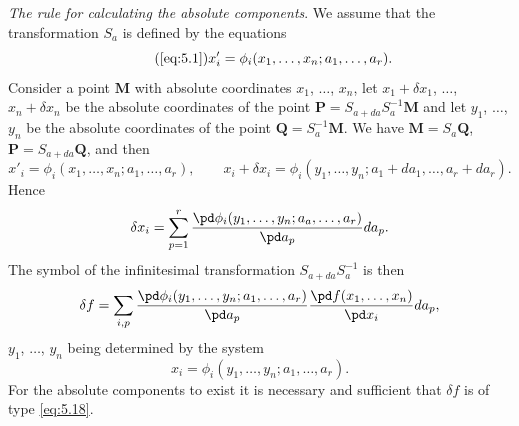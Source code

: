 \somespace

\emph{The rule for calculating the absolute components}. We assume that the transformation $S_{a}$ is defined by the equations
\begin{equation}
  \label{eq:5.1''}\tag{\ref{eq:5.1}}
  x'_{i}=\phi_{i}(x_{1},\dots,x_{n};a_{1},\dots,a_{r}).
\end{equation}
Consider a point $\mathbf{M}$ with absolute coordinates $x_{1}$, $\dots$, $x_{n}$, let $x_{1}+\delta x_{1}$, $\dots$, $x_{n}+\delta x_{n}$ be the absolute coordinates of the point $\mathbf{P}=S_{a+da}S_{a}^{-1}\mathbf{M}$ and let $y_{1}$, $\dots$, $y_{n}$ be the absolute coordinates of the point $\mathbf{Q}=S_{a}^{-1}\mathbf{M}$. We have $\mathbf{M}=S_{a}\mathbf{Q}$, $\mathbf{P}=S_{a+da}\mathbf{Q}$, and then
\[
x'_{i}=\phi_{i}(x_{1},\dots,x_{n};a_{1},\dots,a_{r}),\qquad
x_{i}+\delta x_{i}=\phi_{i}(y_{1},\dots,y_{n};a_{1}+da_{1},\dots,a_{r}+da_{r}).
\]
Hence
\[
\delta x_{i}=\sum_{p=1}^{r}\frac{\pd \phi_{i}(y_{1},\dots,y_{n};a_{a},\dots,a_{r})}{\pd a_{p}}da_{p}.
\]
The symbol of the infinitesimal transformation $S_{a+da}S_{a}^{-1}$ is then
\begin{equation}
  \label{eq:5.19}
  \delta f=\sum_{i,p}\frac{\pd\phi_{i}(y_{1},\dots,y_{n};a_{1},\dots,a_{r})}{\pd a_{p}}\frac{\pd f(x_{1},\dots,x_{n})}{\pd x_{i}}da_{p},
\end{equation}
$y_{1}$, $\dots$, $y_{n}$ being determined by the system
\begin{equation}
  \label{eq:5.20}
  x_{i}=\phi_{i}(y_{1},\dots,y_{n};a_{1},\dots,a_{r}).
\end{equation}
For the absolute components to exist it is necessary and sufficient that $\delta f$ is of type \eqref{eq:5.18}.

\somespace

